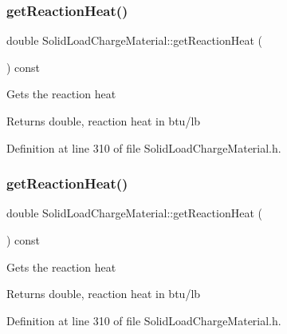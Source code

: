 \subsubsection{\texorpdfstring{get\+Reaction\+Heat()}{getReactionHeat()}\hspace{0.1cm}{\footnotesize\ttfamily [2/3]}}
{\footnotesize\ttfamily double Solid\+Load\+Charge\+Material\+::get\+Reaction\+Heat (\begin{DoxyParamCaption}{ }\end{DoxyParamCaption}) const\hspace{0.3cm}{\ttfamily [inline]}}

Gets the reaction heat \begin{DoxyReturn}{Returns}
double, reaction heat in btu/lb 
\end{DoxyReturn}


Definition at line 310 of file Solid\+Load\+Charge\+Material.\+h.

\mbox{\label{class_solid_load_charge_material_a3481dc84063babc3514a4173e6bd9341}} 
\subsubsection{\texorpdfstring{get\+Reaction\+Heat()}{getReactionHeat()}\hspace{0.1cm}{\footnotesize\ttfamily [3/3]}}
{\footnotesize\ttfamily double Solid\+Load\+Charge\+Material\+::get\+Reaction\+Heat (\begin{DoxyParamCaption}{ }\end{DoxyParamCaption}) const\hspace{0.3cm}{\ttfamily [inline]}}

Gets the reaction heat \begin{DoxyReturn}{Returns}
double, reaction heat in btu/lb 
\end{DoxyReturn}


Definition at line 310 of file Solid\+Load\+Charge\+Material.\+h.

\mbox{\label{class_solid_load_charge_material_a8b02308194b603276df3a894c401e923}} 

